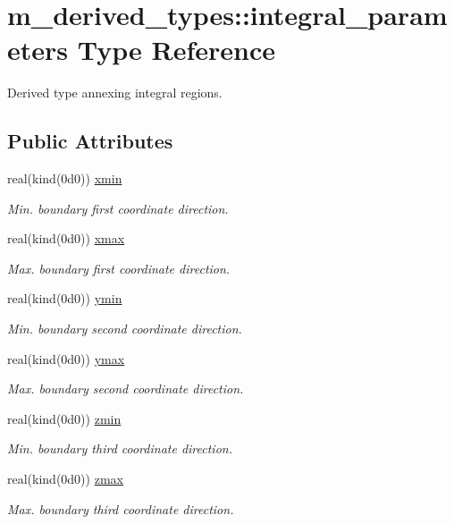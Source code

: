 \hypertarget{structm__derived__types_1_1integral__parameters}{}\section{m\+\_\+derived\+\_\+types\+:\+:integral\+\_\+parameters Type Reference}
\label{structm__derived__types_1_1integral__parameters}


Derived type annexing integral regions.  


\subsection*{Public Attributes}
\begin{DoxyCompactItemize}
\item 
real(kind(0d0)) \hyperlink{structm__derived__types_1_1integral__parameters_a7dfe7f156966273d43c89140f7212138}{xmin}
\begin{DoxyCompactList}\small\item\em Min. boundary first coordinate direction. \end{DoxyCompactList}\item 
real(kind(0d0)) \hyperlink{structm__derived__types_1_1integral__parameters_aede7130654b27625285fad0937c465d0}{xmax}
\begin{DoxyCompactList}\small\item\em Max. boundary first coordinate direction. \end{DoxyCompactList}\item 
real(kind(0d0)) \hyperlink{structm__derived__types_1_1integral__parameters_a65f9263ae3565577571efb3d8c58a18c}{ymin}
\begin{DoxyCompactList}\small\item\em Min. boundary second coordinate direction. \end{DoxyCompactList}\item 
real(kind(0d0)) \hyperlink{structm__derived__types_1_1integral__parameters_a7056df1729145289920886e3764b8489}{ymax}
\begin{DoxyCompactList}\small\item\em Max. boundary second coordinate direction. \end{DoxyCompactList}\item 
real(kind(0d0)) \hyperlink{structm__derived__types_1_1integral__parameters_ac53398acc55c52cc75df02228605b80d}{zmin}
\begin{DoxyCompactList}\small\item\em Min. boundary third coordinate direction. \end{DoxyCompactList}\item 
real(kind(0d0)) \hyperlink{structm__derived__types_1_1integral__parameters_a4e1a68dab53e8c2d6725c0adaf08995f}{zmax}
\begin{DoxyCompactList}\small\item\em Max. boundary third coordinate direction. \end{DoxyCompactList}\end{DoxyCompactItemize}



